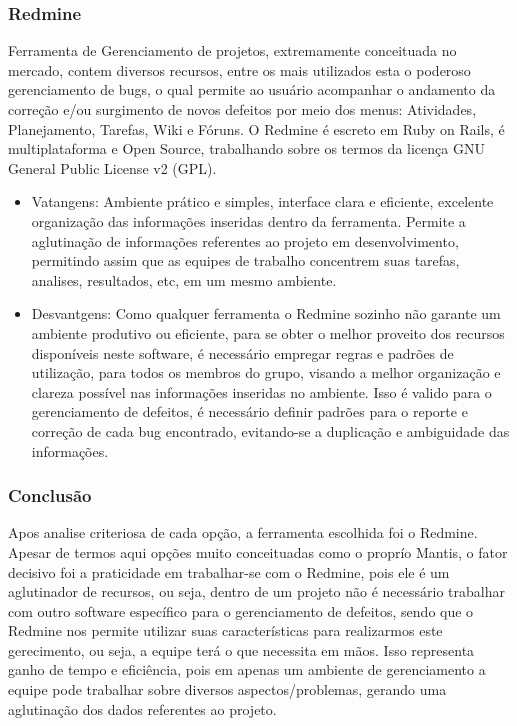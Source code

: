 \documentclass[12pt,a4paper]{article}
\begin{document}
		\subsubsection{Redmine}
		
			 Ferramenta de Gerenciamento de projetos, extremamente conceituada no mercado, contem diversos recursos, 
			 entre os mais utilizados esta o poderoso gerenciamento de bugs, o qual permite ao usuário acompanhar o 
			 andamento da correção e/ou surgimento de novos defeitos por meio dos menus: Atividades, Planejamento, Tarefas, Wiki e Fóruns.
			 O Redmine é escreto em Ruby on Rails, é multiplataforma e Open Source, trabalhando sobre os termos da licença GNU General Public License v2 (GPL).
			 
			 \begin{itemize}
			 	\item Vatangens:
			 		Ambiente prático e simples, interface clara e eficiente, excelente organização das informações inseridas dentro da ferramenta. Permite a aglutinação de informações referentes ao projeto em desenvolvimento, permitindo assim que as equipes de trabalho  concentrem suas tarefas, analises, resultados, etc, em um mesmo ambiente. 
			 	
			 	\item Desvantgens:
			 		Como qualquer ferramenta o Redmine sozinho não garante um ambiente produtivo ou eficiente, para se obter o melhor proveito dos recursos disponíveis neste software, é necessário empregar regras e padrões de utilização, para todos os membros do grupo, visando a melhor organização e clareza possível nas informações inseridas no ambiente. Isso é valido para o gerenciamento de defeitos, é necessário definir padrões para o reporte e correção de cada bug encontrado, evitando-se a duplicação e ambiguidade das informações. 
			 	
			 \end{itemize}
			 
		
		\subsubsection{Conclusão}
		
			Apos analise criteriosa de cada opção, a ferramenta escolhida foi o Redmine. 
			Apesar de termos aqui opções muito conceituadas como o proprío Mantis, o fator decisivo foi a praticidade em trabalhar-se com o Redmine, 
			pois ele é um aglutinador de recursos, ou seja, dentro de um projeto não é necessário trabalhar com outro software específico para o gerenciamento de defeitos, 
			sendo que o Redmine nos permite utilizar suas características para realizarmos este gerecimento, ou seja, a equipe terá o que necessita em mãos. 
			Isso representa ganho de tempo e eficiência, pois em apenas um ambiente de gerenciamento a equipe pode trabalhar sobre diversos aspectos/problemas, 
			gerando uma aglutinação dos dados referentes ao projeto.
		
\end{document}
